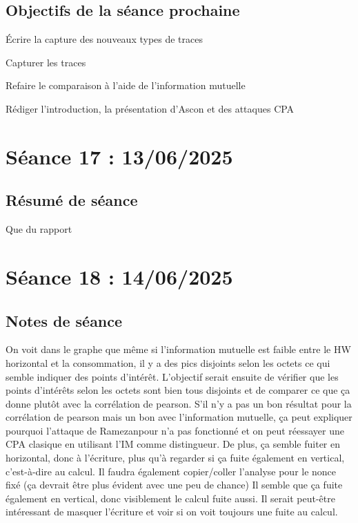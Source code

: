 \documentclass[12pt]{article}
\newcommand{\cmark}{\ding{51}}%
\newcommand{\done}{\rlap{$\square$}{\raisebox{2pt}{\large\hspace{1pt}\cmark}}%
	\hspace{-2.5pt}}
\begin{document}
	\subsection{Objectifs de la séance prochaine}
	\begin{todolist}
		\item[\done] \'Ecrire la capture des nouveaux types de traces
		\item[\done] Capturer les traces
		\item[\done] Refaire le comparaison à l'aide de l'information mutuelle
		\item[\done] Rédiger l'introduction, la présentation d'Ascon et des attaques CPA
	\end{todolist}
	
	\section{Séance 17 : 13/06/2025}
	\subsection{Résumé de séance}
	Que du rapport
	
	
	\section{Séance 18 : 14/06/2025}
	\subsection{Notes de séance}
	On voit dans le graphe que même si l'information mutuelle est faible entre le HW horizontal et la consommation, il y a des pics disjoints selon les octets ce qui semble indiquer des points d'intérêt. L'objectif serait ensuite de vérifier que les points d'intérêts selon les octets sont bien tous disjoints et de comparer ce que ça donne plutôt avec la corrélation de pearson. S'il n'y a pas un bon résultat pour la corrélation de pearson mais un bon avec l'information mutuelle, ça peut expliquer pourquoi l'attaque de Ramezanpour n'a pas fonctionné et on peut réessayer une CPA clasique en utilisant l'IM comme distingueur. De plus, ça semble fuiter en horizontal, donc à l'écriture, plus qu'à regarder si ça fuite également en vertical, c'est-à-dire au calcul. Il faudra également copier/coller l'analyse pour le nonce fixé (ça devrait être plus évident avec une peu de chance)
	Il semble que ça fuite également en vertical, donc visiblement le calcul fuite aussi. Il serait peut-être intéressant de masquer l'écriture et voir si on voit toujours une fuite au calcul.
	
\end{document}
